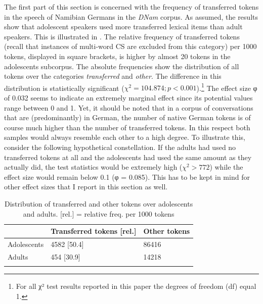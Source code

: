 \documentclass[output=paper]{langsci/langscibook}
\begin{document}
The first part of this section is concerned with the frequency of transferred tokens in the speech of Namibian Germans in the \textit{DNam} corpus. As assumed, the results show that adolescent speakers used more transferred lexical items than adult speakers. This is illustrated in . The relative frequency of transferred tokens (recall that instances of multi-word CS are excluded from this category) per 1000 tokens, displayed in square brackets, is higher by almost 20 tokens in the adolescents subcorpus. The absolute frequencies show the distribution of all tokens over the categories \textit{transferred} and \textit{other}. The difference in this distribution is statistically significant ($\chi^2 = 104.874; p < 0.001$).\footnote{For all χ² test results reported in this paper the degrees of freedom (df) equal 1.} The effect size φ of 0.032 seems to indicate an extremely marginal effect since its potential values range between 0 and 1. Yet, it should be noted that in a corpus of conversations that are (predominantly) in German, the number of native German tokens is of course much higher than the number of transferred tokens. In this respect both samples would always resemble each other to a high degree. To illustrate this, consider the following hypothetical constellation. If the adults had used no transferred tokens at all and the adolescents had used the same amount as they actually did, the test statistics would be extremely high ($\chi^2 > 772$) while the effect size would remain below 0.1 (φ = 0.085). This has to be kept in mind for other effect sizes that I report in this section as well.

  

  
\begin{table}
\centering
\begin{tabularx}{0.6\textwidth}{XYY} 
\lsptoprule
& Transferred tokens {[}rel.{]} & Other tokens\\
\hline
{Adolescents} & {4582 {[}50.4{]}} & {86416}\\
{Adults} & {454 {[}30.9{]}} & {14218}\\
\lspbottomrule
\end{tabularx}
\caption{Distribution of transferred and other tokens over adolescents and adults. {[}rel.{]} = relative freq. per 1000 tokens}
\label{tab:bracke:3}
\end{table}  
\end{document}
